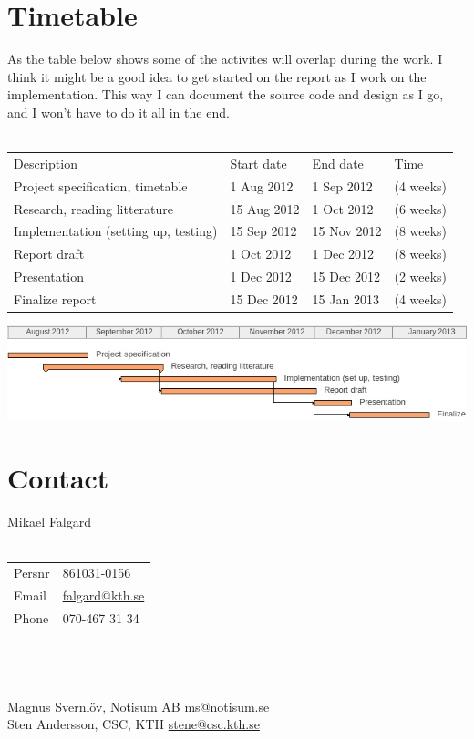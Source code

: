 \documentclass[12pt]{report}
\begin{document}
\pagebreak

\section*{Timetable}
As the table below shows some of the activites will overlap during the work. I think it might be a good idea to get started on the report as I work on the implementation. This way I can document the source code and design as I go, and I won't have to do it all in the end.\\\\
\begin{tabular}{l l l l}
Description & Start date & End date & Time\\
Project specification, timetable & 1 Aug 2012 & 1 Sep 2012 & (4 weeks) \\
Research, reading litterature & 15 Aug 2012 & 1 Oct 2012 & (6 weeks) \\
Implementation (setting up, testing) & 15 Sep 2012 & 15 Nov 2012 & (8 weeks)\\
Report draft & 1 Oct 2012 & 1 Dec 2012 & (8 weeks)\\
Presentation & 1 Dec 2012 & 15 Dec 2012 & (2 weeks)\\
Finalize report & 15 Dec 2012 & 15 Jan 2013 & (4 weeks)\\
\end{tabular}
\vspace{10pt}

\begin{center}
\includegraphics[scale=0.55]{gantt.png}
\end{center}

\section*{Contact}
Mikael Falgard\\\\
\begin{tabular}{l l}
Persnr & 861031-0156 \\
Email & \href{mailto:falgard@kth.se}{falgard@kth.se} \\
Phone & 070-467 31 34 \\
\end{tabular}\\\\\\
Magnus Svernlöv, Notisum AB \href{mailto:ms@notisum.se}{ms@notisum.se}\\
Sten Andersson, CSC, KTH \href{mailto:stene@csc.kth.se}{stene@csc.kth.se}
\end{document}
